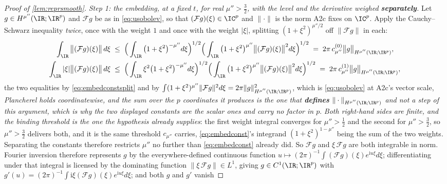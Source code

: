 \begin{proof}[Proof of \cref{lem:reprsmooth}]
\emph{Step 1: the embedding, at a fixed $t$, for real $\mu''>\tfrac32$, with the level and the derivative
weighed \textbf{separately}.} Let
$g\in H^{\mu''}(\IR;\IR^{p})$ and $\mathcal Fg$ be as in \eqref{eq:usobolev}, so that $(\mathcal Fg)(\xi)\in\IC^{p}$
and $\|\cdot\|$ is the norm A2c fixes on $\IC^{p}$. Apply the Cauchy--Schwarz
inequality \emph{twice}, once with the weight $1$ and once with the weight $|\xi|$, splitting
$(1+\xi^{2})^{\mu''/2}$ off $\|\mathcal Fg\|$ in each:
\begin{align}
\int_{\IR}\big\|(\mathcal Fg)(\xi)\big\|\,d\xi
&\;\le\;\Big(\int_{\IR}\big(1+\xi^{2}\big)^{-\mu''}d\xi\Big)^{1/2}
\Big(\int_{\IR}\big(1+\xi^{2}\big)^{\mu''}\big\|(\mathcal Fg)(\xi)\big\|^{2}d\xi\Big)^{1/2}
\;=\;2\pi\,c^{(0)}_{\mu''}\big\|g\big\|_{H^{\mu''}(\IR;\IR^{p})} ,
\notag\\
\int_{\IR}|\xi|\big\|(\mathcal Fg)(\xi)\big\|\,d\xi
&\;\le\;\Big(\int_{\IR}\xi^{2}\big(1+\xi^{2}\big)^{-\mu''}d\xi\Big)^{1/2}
\Big(\int_{\IR}\big(1+\xi^{2}\big)^{\mu''}\big\|(\mathcal Fg)(\xi)\big\|^{2}d\xi\Big)^{1/2}
\;=\;2\pi\,c^{(1)}_{\mu''}\big\|g\big\|_{H^{\mu''}(\IR;\IR^{p})} ,
\label{eq:fourierL1}
\end{align}
the two equalities by \eqref{eq:embedconstsplit} and by
$\int(1+\xi^{2})^{\mu''}\|\mathcal Fg\|^{2}d\xi=2\pi\|g\|^{2}_{H^{\mu''}(\IR;\IR^{p})}$, which is
\eqref{eq:usobolev} at A2c's vector scale, \emph{Plancherel holds coordinatewise, and the sum over
the $p$ coordinates it produces is the one that \textbf{defines} $\|\cdot\|_{H^{\mu''}(\IR;\IR^{p})}$
and not a step of this argument, which is why the two displayed constants are the scalar ones and carry
no factor in $p$}. \emph{Both right-hand sides are finite, and the binding threshold is the one the
hypothesis already supplies}: the first weight integral converges for $\mu''>\tfrac12$ and the second
for $\mu''>\tfrac32$, so $\mu''>\tfrac32$ delivers both, and it is the same threshold
$c_{\mu''}$ carries, \eqref{eq:embedconst}'s integrand $(1+\xi^{2})^{1-\mu''}$ being the sum of the two
weights. Separating the constants therefore restricts $\mu''$ no further than
\eqref{eq:embedconst} already did.
So $\mathcal Fg$ and $\xi\,\mathcal Fg$ are both integrable in norm. Fourier inversion therefore represents
$g$ by the everywhere-defined continuous function
$u\mapsto(2\pi)^{-1}\int(\mathcal Fg)(\xi)e^{\mathrm iu\xi}d\xi$; differentiating under that integral is
licensed by the dominating function $\|\xi\,\mathcal Fg\|\in L^{1}$, giving $g\in C^{1}(\IR;\IR^{p})$ with
$g'(u)=(2\pi)^{-1}\int \mathrm i\xi(\mathcal Fg)(\xi)e^{\mathrm iu\xi}d\xi$; and both $g$ and $g'$ vanish

\end{proof}
